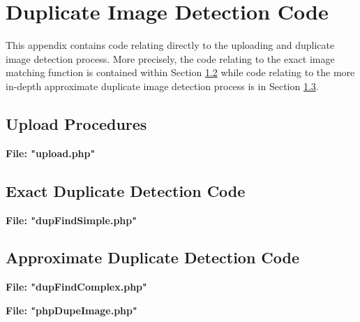 %
%
  
\chapter{Duplicate Image Detection Code}\label{appa:didcode}
This appendix contains code relating directly to the uploading and duplicate image detection process. More precisely, the code relating to the exact image matching function is contained within Section \ref{appa:exact} while code relating to the more in-depth approximate duplicate image detection process is in Section \ref{appa:approx}.

\section{Upload Procedures}\label{appa:upload}
\textbf{File: "upload.php"}

\newpage

\section{Exact Duplicate Detection Code}\label{appa:exact}
\textbf{File: "dupFindSimple.php"}

\newpage

\section{Approximate Duplicate Detection Code}\label{appa:approx}
\textbf{File: "dupFindComplex.php"}

\newpage
\textbf{File: "phpDupeImage.php"}

\newpage

